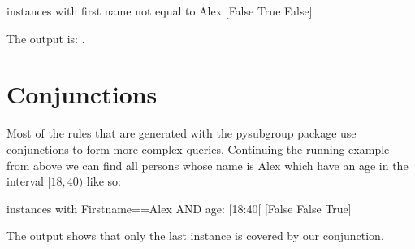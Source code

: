 \documentclass[letterpaper,10pt,english]{sphinxmanual}
\begin{document}
\begin{sphinxVerbatim}[commandchars=\\\{\}]
  
 
\end{sphinxVerbatim}

\begin{sphinxVerbatim}[commandchars=\\\{\}]
instances with first name not equal to Alex [False  True False]
\end{sphinxVerbatim}

The output is: .


\section{Conjunctions}
\label{\detokenize{Selectors:conjunctions}}
Most of the rules that are generated with the pysubgroup package use conjunctions to form more complex queries. Continuing the running example from above we can find all persons whose name is Alex  which have an age in the interval \([18,40)\) like so:

\begin{sphinxVerbatim}[commandchars=\\\{\}]
  \PYG{p}{[} \PYG{p}{]}
  
\end{sphinxVerbatim}

\begin{sphinxVerbatim}[commandchars=\\\{\}]
instances with First\PYGZus{}name==\PYGZsq{}Alex\PYGZsq{} AND age: [18:40[ [False False  True]
\end{sphinxVerbatim}

The output shows that only the last instance is covered by our conjunction.
\end{document}
